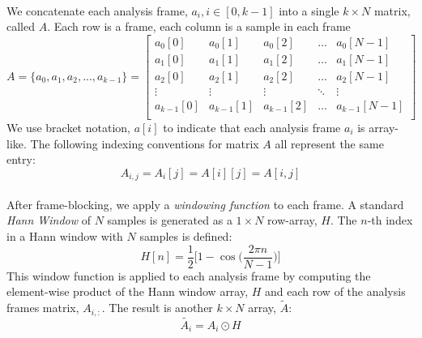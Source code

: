 \documentclass[12pt,letterpaper]{article}
\begin{document}
\paragraph*{}We concatenate each analysis frame, $a_{i}, i \in [0,k-1]$ into a single $k \times N$ matrix, called $A$. Each row is a frame, each column is a sample in each frame
\begin{equation}
\label{eqn-FrameMatrix}
A = \big\{ a_{0} , a_{1} , a_{2} , ... , a_{k-1} \big\} = 
\begin{bmatrix}
a_{0}[0] & a_{0}[1] & a_{0}[2] & \hdots & a_{0}[N-1] \\
a_{1}[0] & a_{1}[1] & a_{1}[2] & \hdots & a_{1}[N-1] \\
a_{2}[0] & a_{2}[1] & a_{2}[2] & \hdots & a_{2}[N-1] \\
\vdots 		& \vdots 	  & \vdots 		& \ddots & \vdots        \\
a_{k-1}[0] & a_{k-1}[1] & a_{k-1}[2] & \hdots & a_{k-1}[N-1] \\
\end{bmatrix}
\end{equation}
We use bracket notation, $a[i]$ to indicate that each analysis frame $a_i$ is array-like. The following indexing conventions for matrix $A$ all represent the same entry:
\begin{equation}
\label{eqn-IndexingA}
A_{i,j} = A_i[j] = A[i][j] = A[i,j]
\end{equation}

\paragraph*{}After frame-blocking, we apply a \textit{windowing function} to each frame. A standard \textit{Hann Window} of $N$ samples is generated as a $1 \times N$ row-array, $H$. The $n$-th index in a Hann window with $N$ samples is defined:
\begin{equation}
\label{eqn-Hann}
H[n] = \frac{1}{2}\bigg[ 1 - \cos\Big( \frac{2\pi n}{N-1}\Big)\bigg]
\end{equation}
This window function is applied to each analysis frame by computing the element-wise product of the Hann window array, $H$ and each row of the analysis frames matrix, $A_{i,:}$. The result is another $k \times N$ array, $\widetilde{A}$:
\begin{equation}
\label{eqn-WindowMatrix}
\widetilde{A_i} = A_i \odot H
\end{equation}
\end{document}
